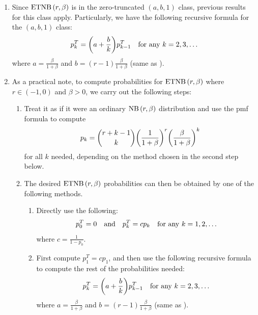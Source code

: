 \begin{enumerate}
Then, the probabilities \(p_0^T,p_1^T,\dotsc\) form the
 with parameters
\(r\in(-1,0)\) and \(\beta>0\) (denoted by \(\etnb{r,\beta}\)).

\item Since \(\etnb{r,\beta}\) is in the zero-truncated \((a,b,1)\) class,
previous results for this class apply. Particularly, we have the following
recursive formula for the \((a,b,1)\) class:
\[
p_k^T=\qty(a+\frac{b}{k})p_{k-1}^{T}\quad\text{for any \(k=2,3,\dotsc\)}
\]
where \(\displaystyle a=\frac{\beta}{1+\beta}\) and \(\displaystyle
b=(r-1)\frac{\beta}{1+\beta}\) (same as ). 

\item \label{it:steps-compute-etnb-prob}
As a practical note, to compute probabilities for \(\etnb{r,\beta}\)
where \(r\in(-1,0)\) and \(\beta>0\), we carry out the following steps:
\begin{enumerate}
\item Treat it as if it were an ordinary \(\operatorname{NB}\left(r,\beta\right)\) distribution and use
the pmf formula to compute
\[
p_k=\binom{r+k-1}{k}\qty(\frac{1}{1+\beta})^{r}\qty(\frac{\beta}{1+\beta})^{k}
\]
for all \(k\) needed, depending on the method chosen in the second step below.

\item The desired \(\etnb{r,\beta}\) probabilities can then be obtained by one
of the following methods.
\begin{enumerate}
\item Directly use the following:
\[
p_0^T=0\qqtext{and}p_k^T=cp_k\quad\text{for any \(k=1,2,\dotsc\)}
\]
where \(\displaystyle c=\frac{1}{1-p_0}\).
\item First compute \(p_1^T=cp_1\), and then use the following recursive
formula to compute the rest of the probabilities needed:
\[
p_k^T=\qty(a+\frac{b}{k})p_{k-1}^{T}\quad\text{for any \(k=2,3,\dotsc\)}
\]
where \(\displaystyle a=\frac{\beta}{1+\beta}\) and \(\displaystyle
b=(r-1)\frac{\beta}{1+\beta}\) (same as ).
\end{enumerate}
\end{enumerate}
\end{enumerate}
